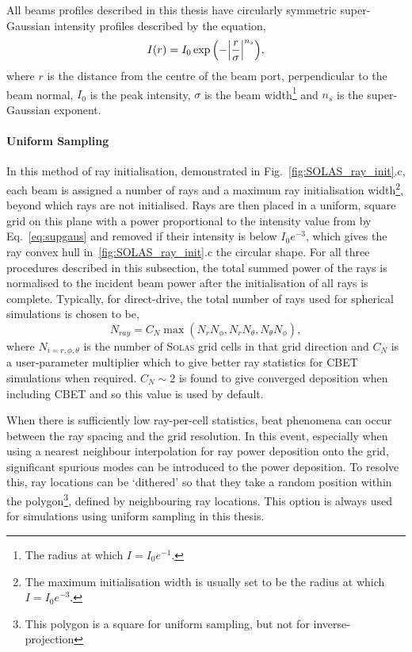 All beams profiles described in this thesis have circularly symmetric super-Gaussian intensity profiles described by the equation,
\begin{equation}
    \label{eq:supgaus}
    I(r) = I_0 \exp{\Bigl( -\Bigl| \frac{r}{\sigma} \Bigr| ^{n_s} \Bigr)},
\end{equation}
where $r$ is the distance from the centre of the beam port, perpendicular to the beam normal, $I_0$ is the peak intensity, $\sigma$ is the beam width\footnote{The radius at which $I=I_0e^{-1}$.} and $n_s$ is the super-Gaussian exponent.

\paragraph*{Uniform Sampling}
In this method of ray initialisation, demonstrated in Fig.~\ref{fig:SOLAS_ray_init}.c, each beam is assigned a number of rays and a maximum ray initialisation width\footnote{The maximum initialisation width is usually set to be the radius at which $I=I_0e^{-3}$.}, beyond which rays are not initialised.
Rays are then placed in a uniform, square grid on this plane with a power proportional to the intensity value from by Eq.~\ref{eq:supgaus} and removed if their intensity is below $I_0e^{-3}$, which gives the ray convex hull in~\ref{fig:SOLAS_ray_init}.c the circular shape.
For all three procedures described in this subsection, the total summed power of the rays is normalised to the incident beam power after the initialisation of all rays is complete.
Typically, for direct-drive, the total number of rays used for spherical simulations is chosen to be,
\begin{equation}
    \label{eq:SOLAS_nray_uniform}
    N_{ray} = C_{N}\max{(N_r N_{\phi},N_r N_{\theta},N_{\theta} N_{\phi})},
\end{equation}
where $N_{i=r,\phi,\theta}$ is the number of \textsc{Solas} grid cells in that grid direction and $C_N$ is a user-parameter multiplier which to give better ray statistics for CBET simulations when required.
$C_N\sim 2$ is found to give converged deposition when including \ac{CBET} and so this value is used by default.

When there is sufficiently low ray-per-cell statistics, beat phenomena can occur between the ray spacing and the grid resolution.
In this event, especially when using a nearest neighbour interpolation for ray power deposition onto the grid, significant spurious modes can be introduced to the power deposition.
To resolve this, ray locations can be `dithered' so that they take a random position within the polygon\footnote{This polygon is a square for uniform sampling, but not for inverse-projection}, defined by neighbouring ray locations.
This option is always used for simulations using uniform sampling in this thesis.

